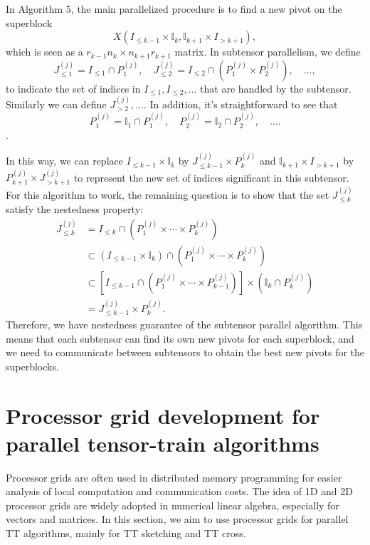 \documentclass[11pt,a4paper,review]{siamart220329}
\begin{document}
In Algorithm 5, the main parallelized procedure is to find a new pivot on the superblock 
\[ X(I_{\le k-1}\times\mathbb{I}_k,\mathbb{I}_{k+1}\times I_{>k+1}), \] 
which is seen as a $r_{k-1}n_k \times n_{k+1}r_{k+1}$ matrix. In subtensor parallelism, we define 
\[ J_{\le 1}^{(j)} = I_{\le 1} \cap P_1^{(j)}, \quad J_{\le 2}^{(j)} = I_{\le 2} \cap (P_1^{(j)} \times P_2^{(j)}), \quad\dots, \] 
to indicate the set of indices in $I_{\le 1}, I_{\le 2}, \dots$ that are handled by the subtensor. Similarly we can define $J_{> 2}^{(j)},\dots$. In addition, it's straightforward to see that 
\[ P_1^{(j)} = \mathbb{I}_1 \cap P_1^{(j)}, \quad P_2^{(j)} = \mathbb{I}_2 \cap P_2^{(j)},\quad \dots. \].

In this way, we can replace $I_{\le k-1}\times\mathbb{I}_k$ by $J_{\le k-1}^{(j)}\times P_k^{(j)}$ and $\mathbb{I}_{k+1}\times I_{>k+1}$ by $P_{k+1}^{(j)}\times J_{>k+1}^{(j)}$ to represent the new set of indices significant in this subtensor. For this algorithm to work, the remaining question is to show that the set $J_{\le k}^{(j)}$ satisfy the nestedness property:
\begin{align*}
J_{\le k}^{(j)} &= I_{\le k} \cap \left(P_1^{(j)} \times\cdots\times P_k^{(j)}\right) \\
&\subset (I_{\le k-1} \times \mathbb{I}_k) \cap \left(P_1^{(j)} \times\cdots\times P_k^{(j)}\right) \\
&\subset \left[I_{\le k-1} \cap \left(P_1^{(j)} \times\cdots\times P_{k-1}^{(j)}\right)\right] \times \left( \mathbb{I}_k \cap P_k^{(j)}\right) \\
&= J_{\le k-1}^{(j)} \times P_k^{(j)}.
\end{align*}
Therefore, we have nestedness guarantee of the subtensor parallel algorithm. This means that each subtensor can find its own new pivots for each superblock, and we need to communicate between subtensors to obtain the best new pivots for the superblocks.

\section{Processor grid development for parallel tensor-train algorithms}
\label{sec:subComm}
Processor grids are often used in distributed memory programming for easier analysis of local computation and communication costs. The idea of 1D and 2D processor grids are widely adopted in numerical linear algebra, especially for vectors and matrices. In this section, we aim to use processor grids for parallel TT algorithms, mainly for TT sketching and TT cross.
\end{document}
